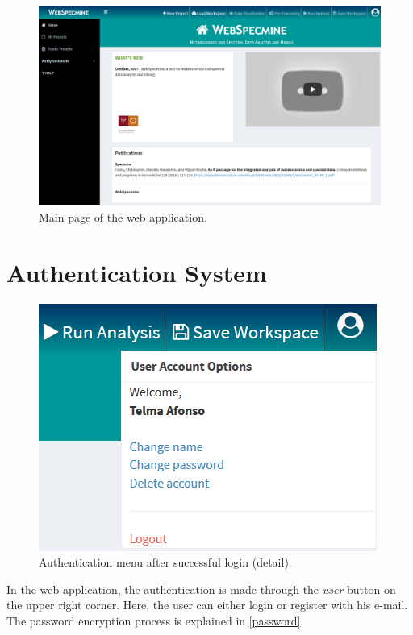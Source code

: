 \begin{figure}[H]
	\centering
	\includegraphics[width=1\linewidth]{Imagens/webspecmine_home}
	\caption{Main page of the web application.}
	\label{webspecmine_home}
\end{figure}


\section{Authentication System}

\begin{figure}
	\centering
	\includegraphics[width=\linewidth]{Imagens/webspecmine_authentication}
	\caption{Authentication menu after successful login (detail).}\label{website_authentication}
\end{figure}

In the web application, the authentication is made through the \textit{user} button on the upper right corner. Here, the user can either login or register with his e-mail. The password encryption process is explained in \autoref{password}.

